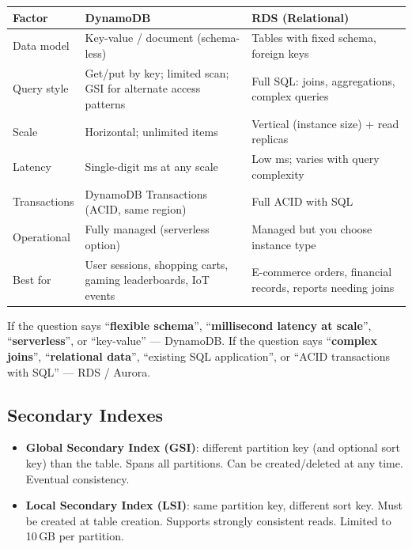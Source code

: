 \begin{comparebox}[title={DynamoDB vs RDS comparison}]
\begin{tabular}{@{}p{3cm}p{4.5cm}p{4.5cm}@{}}
\toprule
\textbf{Factor} & \textbf{DynamoDB} & \textbf{RDS (Relational)} \\
\midrule
Data model   & Key-value / document (schema-less) & Tables with fixed schema, foreign keys \\
Query style  & Get/put by key; limited scan; GSI for alternate access patterns &
               Full SQL: joins, aggregations, complex queries \\
Scale        & Horizontal; unlimited items & Vertical (instance size) + read replicas \\
Latency      & Single-digit ms at any scale & Low ms; varies with query complexity \\
Transactions & DynamoDB Transactions (ACID, same region) & Full ACID with SQL \\
Operational  & Fully managed (serverless option) & Managed but you choose instance type \\
Best for     & User sessions, shopping carts, gaming leaderboards, IoT events &
               E-commerce orders, financial records, reports needing joins \\
\bottomrule
\end{tabular}
\end{comparebox}

\begin{examtip}
If the question says ``\textbf{flexible schema}'', ``\textbf{millisecond latency at scale}'',
``\textbf{serverless}'', or ``key-value'' --- DynamoDB.
If the question says ``\textbf{complex joins}'', ``\textbf{relational data}'',
``existing SQL application'', or ``ACID transactions with SQL'' --- RDS / Aurora.
\end{examtip}

\subsection{Secondary Indexes}

\begin{itemize}
  \item \textbf{Global Secondary Index (GSI)}: different partition key (and optional sort key)
        than the table. Spans all partitions. Can be created/deleted at any time. Eventual consistency.
  \item \textbf{Local Secondary Index (LSI)}: same partition key, different sort key.
        Must be created at table creation. Supports strongly consistent reads.
        Limited to 10\,GB per partition.
\end{itemize}

